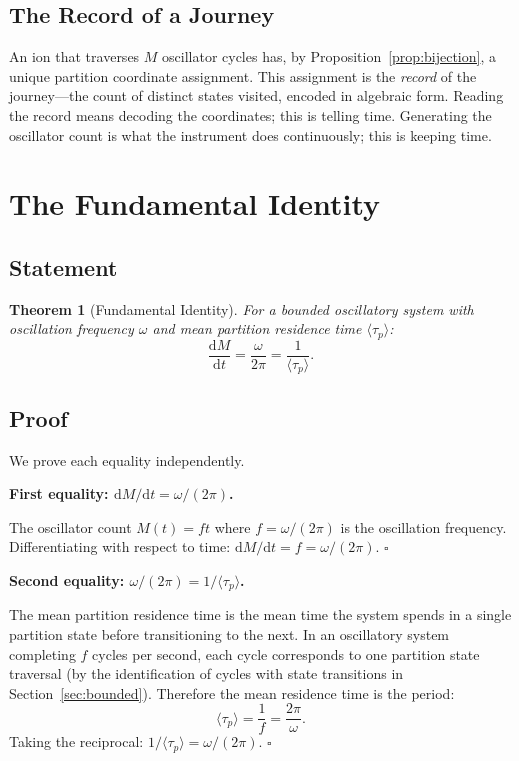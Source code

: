 \documentclass[twocolumn,10pt]{article}
\newtheorem{theorem}{Theorem}[section]
\newcommand{\tp}{\langle\tau_p\rangle}
\newcommand{\dM}{\mathrm{d}M}
\newcommand{\dt}{\mathrm{d}t}
\begin{document}
\subsection{The Record of a Journey}

An ion that traverses $M$ oscillator cycles has, by Proposition~\ref{prop:bijection}, a unique partition coordinate assignment. This assignment is the \emph{record} of the journey---the count of distinct states visited, encoded in algebraic form. Reading the record means decoding the coordinates; this is telling time. Generating the oscillator count is what the instrument does continuously; this is keeping time.

\section{The Fundamental Identity}
\label{sec:identity}

\subsection{Statement}

\begin{theorem}[Fundamental Identity]
\label{thm:fundamental}
For a bounded oscillatory system with oscillation frequency $\omega$ and mean partition residence time $\tp$:
\begin{equation}
    \frac{\dM}{\dt} = \frac{\omega}{2\pi} = \frac{1}{\tp}.
    \label{eq:identity}
\end{equation}
\end{theorem}

\subsection{Proof}

We prove each equality independently.

\textbf{First equality: $\dM/\dt = \omega/(2\pi)$.}

The oscillator count $M(t) = ft$ where $f = \omega/(2\pi)$ is the oscillation frequency. Differentiating with respect to time: $\dM/\dt = f = \omega/(2\pi)$. $\square$

\textbf{Second equality: $\omega/(2\pi) = 1/\tp$.}

The mean partition residence time is the mean time the system spends in a single partition state before transitioning to the next. In an oscillatory system completing $f$ cycles per second, each cycle corresponds to one partition state traversal (by the identification of cycles with state transitions in Section~\ref{sec:bounded}). Therefore the mean residence time is the period:
\begin{equation}
    \tp = \frac{1}{f} = \frac{2\pi}{\omega}.
\end{equation}
Taking the reciprocal: $1/\tp = \omega/(2\pi)$. $\square$
\end{document}
